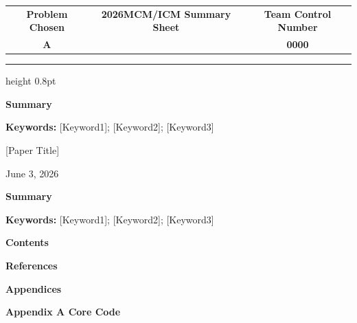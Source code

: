 \documentclass[a4paper,12pt]{article}
\newcommand{\MCMYear}{2026}
\newcommand{\TeamNumber}{0000}
\newcommand{\ProblemChosen}{A}
\newcommand{\PaperTitle}{[Paper Title]}
\newcommand{\PaperDate}{June 3, 2026}
\newcommand{\SummaryText}{}
\newcommand{\KeywordsText}{[Keyword1]; [Keyword2]; [Keyword3]}
\newcommand{\mcmtocentry}[4]{\par\vskip0.55em\noindent%
  \ifthenelse{\equal{#4}{1}}{\bfseries}{}%
  #1\quad#2%
  \leaders\hbox{$\cdot$}\hfill\ #3\par%
}
\begin{document}
\thispagestyle{empty}
\vspace*{-1.8em}
\begin{center}
  \begin{tabular}{ccc}
    \textbf{Problem Chosen} & \textbf{\MCMYear MCM/ICM Summary Sheet} & \textbf{Team Control Number} \\[0.7em]
    \textbf{\LARGE\ProblemChosen} & & \textbf{\LARGE\TeamNumber}
  \end{tabular}
\end{center}
\vspace{0.43em}
\hrule height 0.8pt
\vspace{2.4em}
\begin{center}\textbf{Summary}\end{center}
\vspace{2.1em}
\SummaryText
\vspace{0.75em}
\par\textbf{Keywords:} \KeywordsText
\newpage

\thispagestyle{empty}
\vspace{0.25em}
\begin{center}
  \LARGE\PaperTitle
\end{center}
\vspace{5.8em}
\begin{center}
  \PaperDate
\end{center}
\vspace{2.75em}
\begin{center}\textbf{Summary}\end{center}
\vspace{2.1em}
\SummaryText
\vspace{0.75em}
\par\textbf{Keywords:} \KeywordsText
\newpage

\pagestyle{empty}
\begin{center}
  \LARGE\textbf{Contents}
\end{center}
\vspace{1.6em}
\renewcommand{\contentsname}{}
\tableofcontents
\newpage

\pagestyle{fancy}

\pagebreak[100]

\pagebreak[100]

\pagebreak[100]

\pagebreak[100]



\pagebreak[100]


\pagebreak[100]
\fontsize{20pt}{24pt}\selectfont\textbf{References}\par\normalsize


\pagebreak[100]
\fontsize{28pt}{32pt}\selectfont\textbf{Appendices}\par
\fontsize{20pt}{24pt}\selectfont\textbf{Appendix A \quad Core Code}\par\normalsize

\end{document}
